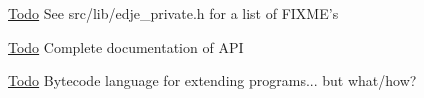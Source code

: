 \begin{Desc}
\item[\hyperlink{todo__todo000001}{Todo}]See src/lib/edje\_\-private.h for a list of FIXME's \end{Desc}
\begin{Desc}
\item[\hyperlink{todo__todo000001}{Todo}]Complete documentation of API \end{Desc}
\begin{Desc}
\item[\hyperlink{todo__todo000001}{Todo}]Bytecode language for extending programs... but what/how?\end{Desc}
